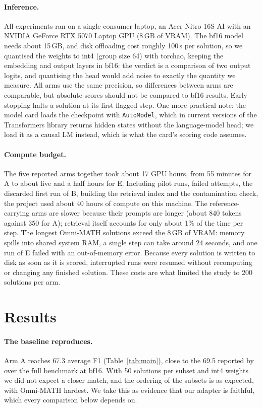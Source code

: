 \documentclass[11pt]{article}
\newcommand{\arm}[1]{\textsc{#1}}
\begin{document}
\paragraph{Inference.} All experiments ran on a single consumer laptop, an Acer Nitro 16S AI
with an NVIDIA GeForce RTX 5070 Laptop GPU (8\,GB of VRAM). The bf16 model
needs about 15\,GB, and disk offloading cost roughly 100\,s per solution, so we quantised the
weights to int4 (group size 64) with torchao, keeping the embedding and output layers in bf16:
the verdict is a comparison of two output logits, and quantising the head would add noise to
exactly the quantity we measure. All arms use the same precision, so differences between
arms are comparable, but absolute scores should not be compared to bf16 results. Early stopping
halts a solution at its first flagged step. One more practical note: the model card loads the
checkpoint with \texttt{AutoModel}, which in current versions of the Transformers library
\citep{wolf2020transformers} returns hidden states without the language-model head; we load it
as a causal LM instead, which is what the card's scoring code assumes.

\paragraph{Compute budget.} The five reported arms together took about 17 GPU hours, from 55
minutes for \arm{A} to about five and a half hours for \arm{E}. Including pilot runs, failed
attempts, the discarded first run of \arm{B}, building the retrieval index and the contamination
check, the project used about 40 hours of compute on this machine. The reference-carrying arms
are slower because their prompts are longer (about 840 tokens against 350 for \arm{A});
retrieval itself accounts for only about 1\% of the time per step. The longest Omni-MATH
solutions exceed the 8\,GB of VRAM: memory spills into shared system RAM, a single step can take
around 24 seconds, and one run of \arm{E} failed with an out-of-memory error. Because every
solution is written to disk as soon as it is scored, interrupted runs were resumed without
recomputing or changing any finished solution. These costs are what limited the study to 200
solutions per arm.

\section{Results}
\label{sec:results}

\paragraph{The baseline reproduces.} Arm \arm{A} reaches 67.3 average F1
(Table~\ref{tab:main}), close to the 69.5 reported by \citet{pala2025pathfinder} over the full
benchmark at bf16. With 50 solutions per subset and int4 weights we did not expect a closer
match, and the ordering of the subsets is as expected, with Omni-MATH hardest. We take this as
evidence that our adapter is faithful, which every comparison below depends on.
\end{document}
